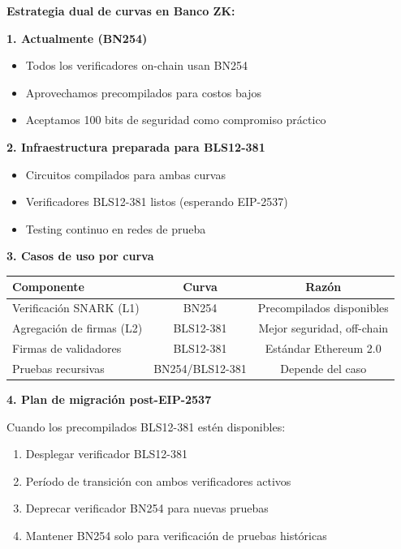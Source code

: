 \documentclass[11pt,a4paper,twoside,openright]{book}
\theoremstyle{definition}
\theoremstyle{plain}
\theoremstyle{remark}
\begin{document}
\begin{bancozk}
\textbf{Estrategia dual de curvas en Banco ZK:}

\textbf{1. Actualmente (BN254)}
\begin{itemize}
    \item Todos los verificadores on-chain usan BN254
    \item Aprovechamos precompilados para costos bajos
    \item Aceptamos 100 bits de seguridad como compromiso práctico
\end{itemize}

\textbf{2. Infraestructura preparada para BLS12-381}
\begin{itemize}
    \item Circuitos compilados para ambas curvas
    \item Verificadores BLS12-381 listos (esperando EIP-2537)
    \item Testing continuo en redes de prueba
\end{itemize}

\textbf{3. Casos de uso por curva}

\begin{center}
\begin{tabular}{lcc}
\toprule
\textbf{Componente} & \textbf{Curva} & \textbf{Razón} \\
\midrule
Verificación SNARK (L1) & BN254 & Precompilados disponibles \\
Agregación de firmas (L2) & BLS12-381 & Mejor seguridad, off-chain \\
Firmas de validadores & BLS12-381 & Estándar Ethereum 2.0 \\
Pruebas recursivas & BN254/BLS12-381 & Depende del caso \\
\bottomrule
\end{tabular}
\end{center}

\textbf{4. Plan de migración post-EIP-2537}

Cuando los precompilados BLS12-381 estén disponibles:
\begin{enumerate}
    \item Desplegar verificador BLS12-381
    \item Período de transición con ambos verificadores activos
    \item Deprecar verificador BN254 para nuevas pruebas
    \item Mantener BN254 solo para verificación de pruebas históricas
\end{enumerate}


\end{bancozk}
\end{document}
